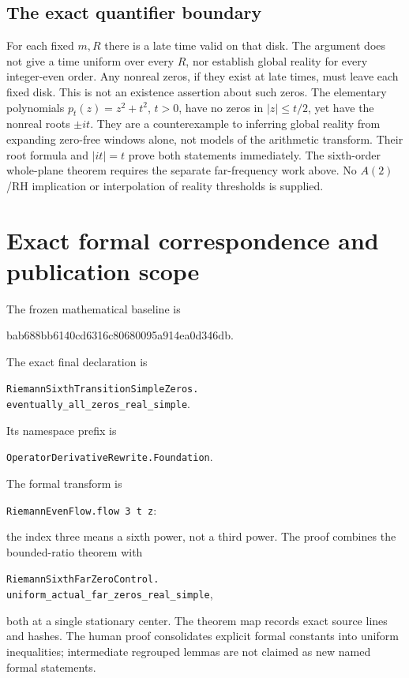 \documentclass[11pt]{article}
\newcommand{\code}[1]{{\small\nolinkurl{#1}}}
\begin{document}
\subsection{The exact quantifier boundary}
For each fixed $m,R$ there is a late time valid on that disk. The
argument does not give a time uniform over every $R$, nor establish
global reality for every integer-even order. Any nonreal zeros, if
they exist at late times, must leave each fixed disk. This is not an
existence assertion about such zeros. The elementary polynomials
$p_t(z)=z^2+t^2$, $t>0$, have no zeros in $|z|\leq t/2$, yet have
the nonreal roots $\pm it$. They are a counterexample to inferring
global reality from expanding zero-free windows alone, not models
of the arithmetic transform. Their root formula and $|it|=t$ prove
both statements immediately. The sixth-order whole-plane theorem
requires the separate far-frequency work above. No $A(2)$/RH
implication or interpolation of reality thresholds is supplied.

\section{Exact formal correspondence and publication scope}
The frozen mathematical baseline is
\begin{center}\small\ttfamily
bab688bb6140cd6316c80680095a914ea0d346db.
\end{center}
The exact final declaration is
\begin{center}\small
\code{RiemannSixthTransitionSimpleZeros.}\\
\code{eventually_all_zeros_real_simple}.
\end{center}
Its namespace prefix is
\begin{center}\code{OperatorDerivativeRewrite.Foundation}.\end{center}
The formal transform is
\begin{center}\code{RiemannEvenFlow.flow 3 t z}:\end{center}
the index three means a sixth power, not a third power.
The proof combines the bounded-ratio theorem with
\begin{center}\code{RiemannSixthFarZeroControl.}\\
\code{uniform_actual_far_zeros_real_simple},\end{center}
both at a single stationary center. The theorem map records
exact source lines and hashes. The human proof consolidates
explicit formal constants into uniform inequalities;
intermediate regrouped lemmas are not claimed as new named
formal statements.
\end{document}
